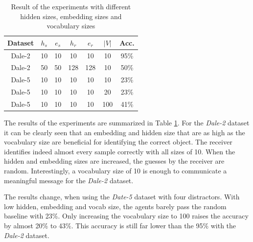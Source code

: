 \documentclass[11pt]{article}
\begin{document}
\begin{table}[b]
  \centering
  \begin{tabular}{c|ccccc|c}
    \hline
    \textbf{Dataset} & $h_{s}$ & $e_{s}$ & $h_{r}$ & $e_{r}$ & $|V|$ & \textbf{Acc.} \\
    \hline
    Dale-2           & {10}    & {10}    & {10}    & {10}    & {10}  & {95\%}        \\
    Dale-2           & {50}    & {50}    & {128}   & {128}   & {10}  & {50\%}        \\
    Dale-5           & {10}    & {10}    & {10}    & {10}    & {10}  & {23\%}        \\
    Dale-5           & {10}    & {10}    & {10}    & {10}    & {20}  & {23\%}        \\
    Dale-5           & {10}    & {10}    & {10}    & {10}    & {100} & {41\%}        \\
    \hline
  \end{tabular}
  \caption{Result of the experiments with different hidden sizes, embedding sizes and vocabulary sizes}
  \label{tab:results}
\end{table}

The results of the experiments are summarized in Table \ref{tab:results}.
For the \emph{Dale-2} dataset it can be clearly seen that an embedding and hidden size that are as high as the vocabulary size are beneficial for identifying the correct object.
The receiver identifies indeed almost every sample correctly with all sizes of 10.
When the hidden and embedding sizes are increased, the guesses by the receiver are random.
Interestingly, a vocabulary size of 10 is enough to communicate a meaningful message for the \emph{Dale-2} dataset.


The results change, when using the \emph{Date-5} dataset with four distractors.
With low hidden, embedding and vocab size, the agents barely pass the random baseline with 23\%.
Only increasing the vocabulary size to 100 raises the accuracy by almost 20\% to 43\%.
This accuracy is still far lower than the 95\% with the \emph{Dale-2} dataset.

\end{document}

